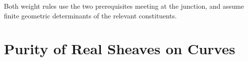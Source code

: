 \documentclass[11pt]{article}
\theoremstyle{plain}
\theoremstyle{definition}
\newcommand{\Fq}{\mathbf F_{r}}
\newcommand{\uses}[1]{\par\smallskip\noindent{\footnotesize\textit{Uses:}\ #1\par}\smallskip}
\begin{document}
\begin{landscape}
\par\vspace{2mm}
{\small Both weight rules use the two prerequisites meeting at the junction,
and assume finite geometric determinants of the relevant constituents.}
\par\endgroup
\end{landscape}
\endgroup

\clearpage
\begingroup
\setlength{\emergencystretch}{3em}
\let\realpurityuses\uses
\renewcommand{\uses}[1]{{\raggedright\realpurityuses{#1}}}
\let\realpurityexternalinput\externalinput
\let\endrealpurityexternalinput\endexternalinput
\renewenvironment{externalinput}[1][]{%
  \begingroup\color{blue!60!black}\realpurityexternalinput[#1]}{%
  \endrealpurityexternalinput\endgroup}
\renewcommand{\Fq}{\mathbf F_q}
\newcommand{\Ql}{\mathbf Q_\ell}
\newcommand{\Qlb}{\overline{\mathbf Q}_\ell}
\newcommand{\Frob}{\operatorname{Frob}}
\newcommand{\Gal}{\operatorname{Gal}}
\newcommand{\Lie}{\operatorname{Lie}}
\newcommand{\GL}{\operatorname{GL}}
\newcommand{\wt}{\operatorname{wt}}
\newcommand{\dw}{\operatorname{dw}}
\ExplSyntaxOn
{}
\ExplSyntaxOff
\section{Purity of Real Sheaves on Curves}
\label{sec:purity-real-sheaves}
\begin{abstract}
content: purity of real sheaves on curves
\\key theorem: Thm \ref{p:real-purity}
\\references: mainly by KW, but the CFT and representation theory part is replaced by detailed blueprint
\end{abstract}
\end{document}
